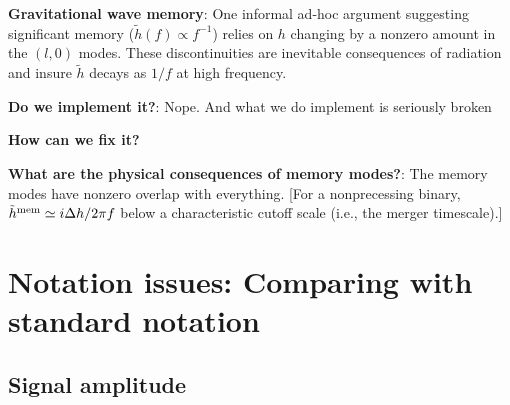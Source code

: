 \documentclass[twocolumn,prd,nofootinbib]{revtex4}
\begin{document}
\begin{shaded}
\noindent \textbf{Gravitational wave memory}: One informal   ad-hoc argument suggesting significant memory ($\tilde{h}(f)\propto f^{-1}$)
  relies on $h$ changing by a nonzero amount in the $(l,0)$ modes.    These discontinuities are inevitable consequences
  of radiation and insure $\tilde{h}$ decays as $1/f$ at high frequency.

\noindent \textbf{Do we implement it?}: Nope.  And what we do implement is seriously broken

\noindent \textbf{How can we fix it?}

\noindent \textbf{What are the physical consequences of memory modes?}: The memory modes have nonzero overlap with
everything. [For a nonprecessing binary, $\tilde{h}^{\rm mem} \simeq i \Delta h/2\pi f$ below a characteristic cutoff
scale (i.e., the merger timescale).]
\end{shaded}
\section{Notation issues: Comparing with standard notation}

\subsection{Signal amplitude}
\end{document}
